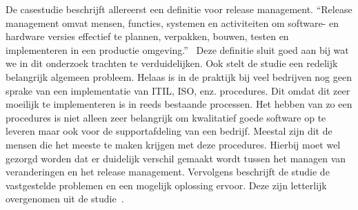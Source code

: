 De casestudie \autocite{Lahtela2011} beschrijft allereerst een definitie voor release management. “Release management omvat mensen, functies, systemen en activiteiten om software- en hardware versies effectief te plannen, verpakken, bouwen, testen en implementeren in een productie omgeving.”~\textcite{Lahtela2011} Deze definitie sluit goed aan bij wat we in dit onderzoek trachten te verduidelijken. Ook stelt de studie een redelijk belangrijk algemeen probleem. Helaas is in de praktijk bij veel bedrijven nog geen sprake van een implementatie van ITIL, ISO, enz. procedures. Dit omdat dit zeer moeilijk te implementeren is in reeds bestaande processen. Het hebben van zo een procedures is niet alleen zeer belangrijk om kwalitatief goede software op te leveren maar ook voor de supportafdeling van een bedrijf. Meestal zijn dit de mensen die het meeste te maken krijgen met deze procedures. Hierbij moet wel gezorgd worden dat er duidelijk verschil gemaakt wordt tussen het managen van veranderingen en het release management. Vervolgens beschrijft de studie de vastgestelde problemen en een mogelijk oplossing ervoor. Deze zijn letterlijk overgenomen uit de studie~\textcite{Lahtela2011}.
